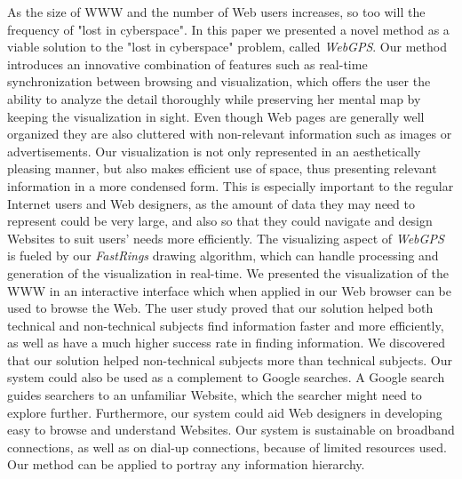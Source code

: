 \documentclass[10pt,psfig]{article}
\begin{document}
{%

As the size of WWW and the number of Web users increases, so too will the frequency of "lost in cyberspace".
In this paper we presented a novel method as a viable solution to the "lost in cyberspace" problem, called {\em WebGPS}.
Our method introduces an innovative combination of features such as real-time synchronization between browsing and visualization, which offers the user the ability to analyze the detail thoroughly while preserving her mental map by keeping the visualization in sight.
Even though Web pages are generally well organized they are also cluttered with non-relevant information such as images or advertisements.
Our visualization is not only represented in an aesthetically pleasing manner, but also makes efficient use of space, thus presenting relevant information in a more condensed form.
This is especially important to the regular Internet users and Web designers, as the amount of data they may need to represent could be very large, and also so that they could navigate and design Websites to suit users' needs more efficiently.
The visualizing aspect of {\em WebGPS} is fueled by our {\em FastRings} drawing algorithm, which can handle processing and generation of the visualization in real-time.
We presented the visualization of the WWW in an interactive interface which when applied in our Web browser can be used to browse the Web.
The user study proved that our solution helped both technical and non-technical subjects find information faster and more efficiently, as well as have a much higher success rate in finding information.
We discovered that our solution helped non-technical subjects more than technical subjects.
Our system could also be used as a complement to Google searches. A Google search guides searchers to an unfamiliar Website, which the searcher might need to explore further.
Furthermore, our system could aid Web designers in developing easy to browse and understand Websites.   
Our system is sustainable on broadband connections, as well as on dial-up connections, because of limited resources used.
Our method can be applied to portray any information hierarchy.

}
\end{document}
